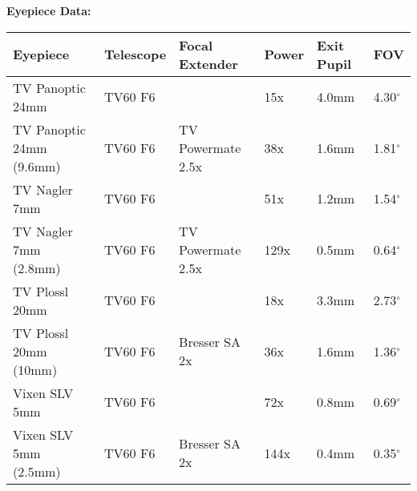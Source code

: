 \newpage
{\bf Eyepiece Data:}
\begin{longtable}{@{}llllll@{}}
\hline
{\bf Eyepiece} & {\bf Telescope} & {\bf Focal Extender} & {\bf Power} & {\bf Exit Pupil} & {\bf FOV}\\
\hline
TV Panoptic 24mm & TV60 F6 & & 15x & 4.0mm & 4.30$^{\circ}$ \\
TV Panoptic 24mm (9.6mm)& TV60 F6 & TV Powermate 2.5x & 38x & 1.6mm & 1.81$^{\circ}$ \\
TV Nagler 7mm & TV60 F6 & & 51x & 1.2mm & 1.54$^{\circ}$ \\
TV Nagler 7mm (2.8mm)& TV60 F6 & TV Powermate 2.5x & 129x & 0.5mm & 0.64$^{\circ}$ \\
\hline
TV Plossl 20mm & TV60 F6 & & 18x & 3.3mm & 2.73$^{\circ}$ \\
TV Plossl 20mm (10mm) & TV60 F6 & Bresser SA 2x & 36x & 1.6mm & 1.36$^{\circ}$ \\
Vixen SLV 5mm & TV60 F6 & & 72x & 0.8mm & 0.69$^{\circ}$ \\
Vixen SLV 5mm (2.5mm) & TV60 F6 & Bresser SA 2x & 144x & 0.4mm & 0.35$^{\circ}$ \\
\hline
\end{longtable}
